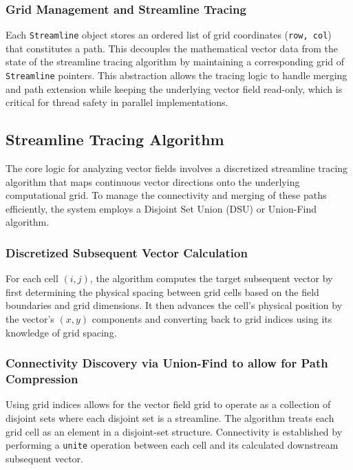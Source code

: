 \subsubsection{Grid Management and Streamline Tracing}

Each \texttt{Streamline} object stores an ordered list of grid coordinates (\texttt{row, col}) that constitutes a path.
This decouples the mathematical vector data from the state of the streamline tracing algorithm by maintaining a corresponding grid of \texttt{Streamline} pointers.
This abstraction allows the tracing logic to handle merging and path extension while keeping the underlying vector field read-only, which is critical for thread safety in parallel implementations.

\subsection{Streamline Tracing Algorithm}

The core logic for analyzing vector fields involves a discretized streamline tracing algorithm that maps continuous vector directions onto the underlying computational grid.
To manage the connectivity and merging of these paths efficiently, the system employs a Disjoint Set Union (DSU) or Union-Find algorithm.


\subsubsection{Discretized Subsequent Vector Calculation}
For each cell $(i, j)$, the algorithm computes the target subsequent vector by first determining the physical spacing between grid cells based on the field boundaries and grid dimensions.
It then advances the cell's physical position by the vector's $(x, y)$ components and converting back to grid indices using its knowledge of grid spacing.

\subsubsection{Connectivity Discovery via Union-Find to allow for Path Compression}
Using grid indices allows for the vector field grid to operate as a collection of disjoint sets where each disjoint set is a streamline.
The algorithm treats each grid cell as an element in a disjoint-set structure.
Connectivity is established by performing a \texttt{unite} operation between each cell and its calculated downstream subsequent vector.

